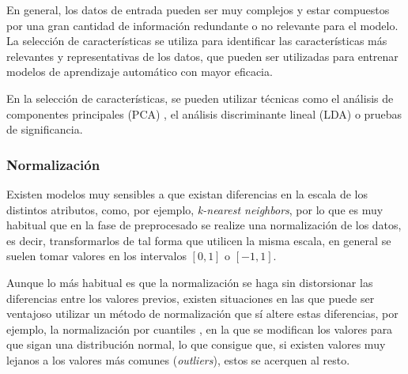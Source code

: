 En general, los datos de entrada pueden ser muy complejos y estar compuestos por
una gran cantidad de información redundante o no relevante para el modelo. La
selección de características se utiliza para identificar  las características
más relevantes y representativas de los datos, que pueden ser utilizadas para
entrenar modelos de aprendizaje automático con mayor eficacia.

En la selección de características, se pueden utilizar técnicas como el análisis
de componentes principales (PCA) \cite{mackiewicz1993principal}, el análisis
discriminante lineal (LDA) \cite{xanthopoulos2013linear} o pruebas de
significancia.

\subsubsection{Normalización}

Existen modelos muy sensibles a que existan diferencias en la escala de los
distintos atributos, como, por ejemplo, \textit{k-nearest neighbors}, por lo que
es muy habitual que en la fase de preprocesado se realize una normalización de
los datos, es decir, transformarlos de tal forma que utilicen la misma escala,
en general se suelen tomar valores en los intervalos $[0, 1]$ o $[-1, 1]$.

Aunque lo más habitual es que la normalización se haga sin distorsionar las
diferencias entre los valores previos, existen situaciones en las que puede ser
ventajoso utilizar un método de normalización que sí altere estas diferencias,
por ejemplo, la normalización por cuantiles \cite{enwiki:1138433182}, en la que
se modifican los valores para que sigan una distribución normal, lo que consigue
que, si existen valores muy lejanos a los valores más comunes
(\textit{outliers}), estos se acerquen al resto. 
